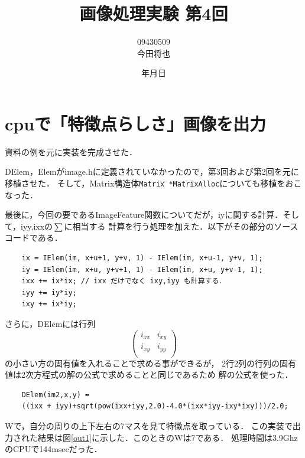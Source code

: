 \documentclass[11pt]{jarticle}
\begin{document}
\title{画像処理実験 第4回}
\author{09430509\\今田将也}
\date{\number\year 年\number\month 月\number\day 日}
\maketitle

\section{cpuで「特徴点らしさ」画像を出力}

資料の例を元に実装を完成させた．

DElem，Elemがimage.hに定義されていなかったので，第3回および第2回を元に移植させた．
そして，Matrix構造体\verb|Matrix *MatrixAlloc|についても移植をおこなった．

最後に，今回の要であるImageFeature関数についてだが，iyに関する計算．そして，iyy,ixxの$\sum$に相当する
計算を行う処理を加えた．以下がその部分のソースコードである．
\begin{verbatim}
    ix = IElem(im, x+u+1, y+v, 1) - IElem(im, x+u-1, y+v, 1);
    iy = IElem(im, x+u, y+v+1, 1) - IElem(im, x+u, y+v-1, 1);
    ixx += ix*ix; // ixx だけでなく ixy,iyy も計算する． 
    iyy += iy*iy;
    ixy += ix*iy;
\end{verbatim}
さらに，DElemには行列
\[
  \left(
    \begin{array}{cc}
      i_{xx} & i_{xy} \\
      i_{xy} & i_{yy} \\
    \end{array}
  \right)
\]
の小さい方の固有値を入れることで求める事ができるが，
2行2列の行列の固有値は2次方程式の解の公式で求めることと同じであるため
解の公式を使った．

\begin{verbatim}
    DElem(im2,x,y) = 
    ((ixx + iyy)+sqrt(pow(ixx+iyy,2.0)-4.0*(ixx*iyy-ixy*ixy)))/2.0;
\end{verbatim}
Wで，自分の周りの上下左右の7マスを見て特徴点を取っている．
この実装で出力された結果は図\ref{out1}に示した．このときのWは7である．
処理時間は3.9GhzのCPUで144msecだった．
\end{document}
